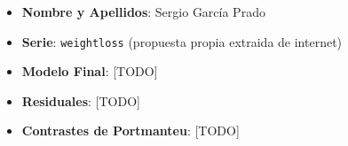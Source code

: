 \documentclass[a4paper, spanish]{article}
\begin{document}
  \begin{itemize}
    \item \textbf{Nombre y Apellidos}: Sergio García Prado
    \item \textbf{Serie}: \texttt{weightloss} (propuesta propia extraida de internet)
    \item \textbf{Modelo Final}: [TODO]
    \item \textbf{Residuales}: [TODO]
    \item \textbf{Contrastes de Portmanteu}: [TODO]
  \end{itemize}
\end{document}
